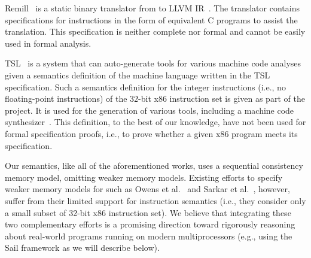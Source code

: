 Remill~\cite{McSema:Recon14} is a static binary translator from \ISA to LLVM
IR~\cite{LLVM:CGO04}. The translator contains specifications for \ISA instructions
in the form of equivalent C programs to assist the translation. This
specification is neither complete nor formal and cannot be easily used
in formal analysis.

TSL~\cite{TSL:TOPLAS13} is a system that can auto-generate tools for
various machine code analyses given a semantics definition of the machine
language written in the TSL specification. Such a semantics
definition for the integer instructions (i.e., no floating-point instructions) of the $32$-bit x86 instruction set is given
as part of the project. It is used for the generation of
various tools, including a machine code synthesizer~\cite{Srinivasan2015}.
This definition, to the best of our knowledge, have not been used
for formal specification proofs, i.e., to prove whether a given x86
program meets its specification.

Our semantics, like all of the aforementioned works, uses a sequential consistency memory model, omitting weaker memory models.
Existing efforts to specify weaker memory models for \ISA such as Owens et al.~\cite{Owens:x86-TSO} and Sarkar et al.~\cite{Sarkar:POPL09}, however, suffer from their limited support for instruction semantics (i.e., they consider only a small subset of 32-bit x86 instruction set).
We believe that integrating these two complementary efforts is a promising direction toward rigorously reasoning about real-world programs running on modern multiprocessors (e.g., using the Sail framework as we will describe below).


